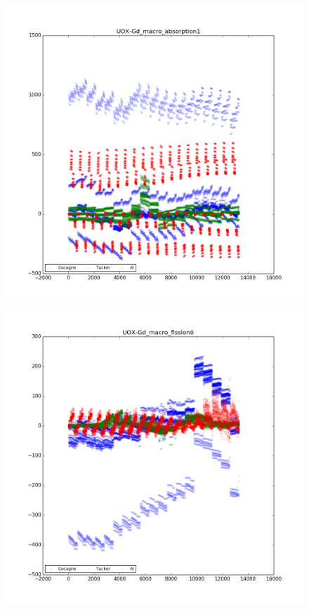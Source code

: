 \begin{center}
\begin{figure}[h] 
   \begin{minipage}[b]{0.5\linewidth}
      \centering \includegraphics[scale=0.3]{images/UOX-Gd/UOX-Gd_macro_absorption1.png}
   \end{minipage}
   \begin{minipage}[b]{0.5\linewidth}
      \centering \includegraphics[scale=0.3]{images/UOX-Gd/UOX-Gd_macro_fission0.png}

\end{minipage}
\end{figure}
\end{center}
